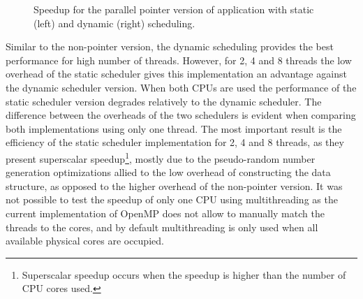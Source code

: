 \begin{figure}[!htp]
	\begin{center}
		\caption{Speedup for the parallel pointer version of \tth application with static (left) and dynamic (right) scheduling.}
		\label{fig:PointerSpeedup}
	\end{center}
\end{figure}

Similar to the non-pointer version, the dynamic scheduling provides the best performance for high number of threads. However, for 2, 4 and 8 threads the low overhead of the static scheduler gives this implementation an advantage against the dynamic scheduler version. When both CPUs are used the performance of the static scheduler version degrades relatively to the dynamic scheduler. The difference between the overheads of the two schedulers is evident when comparing both implementations using only one thread. The most important result is the efficiency of the static scheduler implementation for 2, 4 and 8 threads, as they present superscalar speedup\footnote{Superscalar speedup occurs when the speedup is higher than the number of CPU cores used.}, mostly due to the pseudo-random number generation optimizations allied to the low overhead of constructing the data structure, as opposed to the higher overhead of the non-pointer version. It was not possible to test the speedup of only one CPU using multithreading as the current implementation of OpenMP does not allow to manually match the threads to the cores, and by default multithreading is only used when all available physical cores are occupied.

